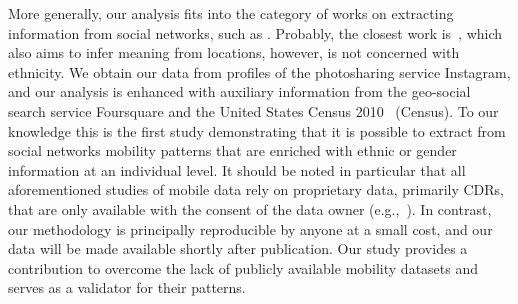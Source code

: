 
% 
More generally, our analysis fits into the category of works on extracting information from social networks, such as \cite{Cranshaw:2010:BGP:1864349.1864380}. Probably, the closest work is~\cite{Zhong:2015:YYG:2684822.2685287}, which also aims to infer meaning from locations, however, is not concerned with ethnicity. We obtain our data from profiles of the photosharing service Instagram, and our analysis is enhanced with auxiliary information from the geo-social search service Foursquare and the United States Census 2010~\cite{census:2010} (Census). To our knowledge this is the first study demonstrating that it is possible to extract from social networks mobility patterns that are enriched with ethnic or gender information at an individual level. It should be noted in particular that all aforementioned studies of mobile data rely on proprietary data, primarily CDRs, that are only available with the consent of the data owner (e.g.,~\cite{de2013unique,LathiaQC12}). In contrast, our methodology is principally reproducible by anyone at a small cost, and our data will be made available shortly after publication. Our study provides a contribution to overcome the lack of publicly available mobility datasets and serves as a validator for their patterns.
